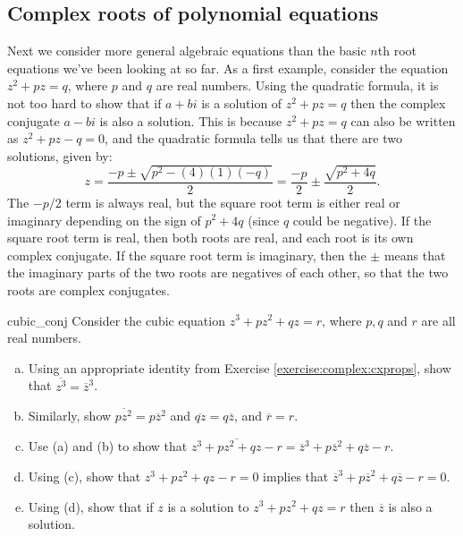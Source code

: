 \subsection{Complex roots of polynomial equations\quad
{}}\label{sec:FTOA}

Next we consider more general algebraic equations than the basic $n$th root equations we've been looking at so far.  As a first example, consider the equation $z^2 + pz = q$, where $p$ and  $q$ are real numbers. Using  the quadratic formula, it is not too hard to show that if $a + bi$ is a solution of $z^2 + pz = q$ then the complex conjugate $a - bi$ is also a solution. This is because  $z^2 + pz = q$ can also be written as  $z^2 + pz - q = 0$, and the quadratic formula tells us that there are two solutions, given by:
$$ z = \frac{-p \pm \sqrt{p^2 - (4)(1)(-q)}}{2} = \frac{-p}{2}  \pm \frac{\sqrt{p^2 + 4q}}{2}.$$
The $-p/2$ term is always real, but the square root term is either real or imaginary depending on the sign of $p^2 + 4q$  (since $q$ could be negative).  If the square root term is real, then both roots are real, and each root is its own complex conjugate.  If the square root term is imaginary, then the $\pm$ means that the imaginary parts of the two roots are negatives of each other, so that the two roots are complex conjugates.

\begin{exercise}{cubic_conj}
Consider the cubic equation $z^3 + pz^2 + qz = r$, where $p, q$ and  $r$ are all real numbers.
\begin{enumerate}[(a)]
\item
Using an appropriate identity from Exercise \ref{exercise:complex:cxprops}, show that $\overline{z^3} = \overline{z}^3$.
\item
Similarly, show  $\overline{pz^2} = p\overline{z}^2$ and $\overline{qz} = q\overline{z}$, and $\overline{r} = r$.
\item 
Use (a) and (b) to show that $\overline{z^3 + pz^2 + qz - r} = \overline{z}^3 + p\overline{z}^2 + q\overline{z} - r$.
\item
Using (c), show that $z^3 + pz^2 + qz - r = 0$ implies that $\overline{z}^3 + p\overline{z}^2 + q\overline{z} - r = 0$.
\item
Using (d), show that if $z$ is a solution to $z^3 + pz^2 + qz = r$ then $\overline{z}$ is also a solution.
\end{enumerate}
\end{exercise}

